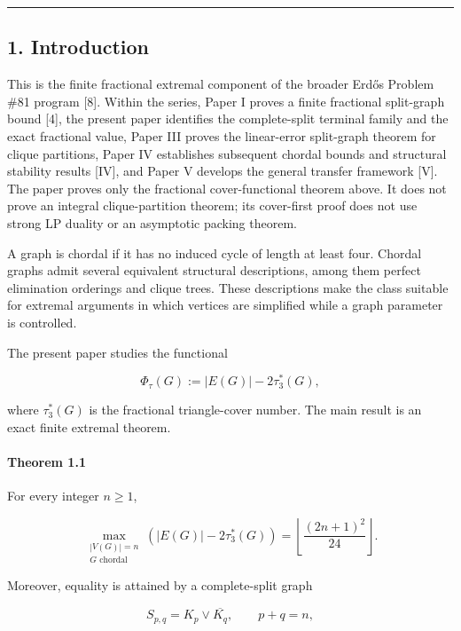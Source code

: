 \documentclass[english,11pt,a4paper]{article}
\begin{document}
\begin{center}\rule{0.5\linewidth}{0.5pt}\end{center}

\subsection{1. Introduction}\label{introduction}

This is the finite fractional extremal component of the broader Erdős
Problem \#81 program {[}8{]}. Within the series, Paper I proves a finite
fractional split-graph bound {[}4{]}, the present paper identifies the
complete-split terminal family and the exact fractional value, Paper III
proves the linear-error split-graph theorem for clique partitions, Paper
IV establishes subsequent chordal bounds and structural stability
results {[}IV{]}, and Paper V develops the general transfer framework
{[}V{]}. The paper proves only the fractional cover-functional theorem
above. It does not prove an integral clique-partition theorem; its
cover-first proof does not use strong LP duality or an asymptotic
packing theorem.

A graph is chordal if it has no induced cycle of length at least four.
Chordal graphs admit several equivalent structural descriptions, among
them perfect elimination orderings and clique trees. These descriptions
make the class suitable for extremal arguments in which vertices are
simplified while a graph parameter is controlled.

The present paper studies the functional

\[
\Phi_\tau(G):=|E(G)|-2\tau_3^*(G),
\]

where \(\tau_3^*(G)\) is the fractional triangle-cover number. The main
result is an exact finite extremal theorem.

\paragraph{Theorem 1.1}\label{theorem-1.1}

For every integer \(n\ge1\),

\[
\boxed{
\max_{\substack{|V(G)|=n\\G\text{ chordal}}}
\left(
|E(G)|-2\tau_3^*(G)
\right)
=
\left\lfloor\frac{(2n+1)^2}{24}\right\rfloor
}.
\]

Moreover, equality is attained by a complete-split graph

\[
S_{p,q}=K_p\vee\overline{K_q},
\qquad
p+q=n,
\]
\end{document}
